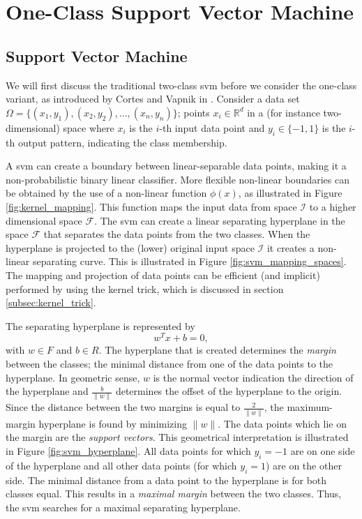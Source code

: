 \section{One-Class Support Vector Machine}\label{sec:one_class_svm}


\subsection{Support Vector Machine}\label{subsec:svm}
We will first discuss the traditional two-class \gls{svm} before we consider the one-class variant, as introduced by Cortes and Vapnik in \cite{cortes1995support}.
Consider a data set $\Omega = \{ (x_1, y_1),\allowbreak (x_2, y_2), \dots , (x_n, y_n) \}$; points $x_i \in \mathbb{R}^d$ in a (for instance two-dimensional) space where $x_i$ is the $i$-th input data point and $y_i \in \{-1, 1\}$ is the $i$-th output pattern, indicating the class membership.

A \gls{svm} can create a boundary between linear-separable data points, making it a non-probabilistic binary linear classifier.
More flexible non-linear boundaries can be obtained by the use of a non-linear function $\phi(x)$, as illustrated in Figure \ref{fig:kernel_mapping}.
This function maps the input data from space $\mathcal{I}$ to a higher dimensional space $\mathcal{F}$.
The \gls{svm} can create a linear separating hyperplane in the space $\mathcal{F}$ that separates the data points from the two classes.
When the hyperplane is projected to the (lower) original input space $\mathcal{I}$ it creates a non-linear separating curve.
This is illustrated in Figure \ref{fig:svm_mapping_spaces}.
The mapping and projection of data points can be efficient (and implicit) performed by using the kernel trick, which is discussed in section \ref{subsec:kernel_trick}.

The separating hyperplane is represented by
\begin{equation}
w^T x + b = 0,
\end{equation}
with $w \in F$ and $b \in R$.
The hyperplane that is created determines the \emph{margin} between the classes; the minimal distance from one of the data points to the hyperplane.
In geometric sense, $w$ is the normal vector indication the direction of the hyperplane and $\frac{b}{\lVert{w}\rVert}$ determines the offset of the hyperplane to the origin.
Since the distance between the two margins is equal to $\frac{2}{\lVert{w}\rVert}$, the maximum-margin hyperplane is found by minimizing $\lVert{w}\rVert$.
The data points which lie on the margin are the \emph{support vectors}.
This geometrical interpretation is illustrated in Figure \ref{fig:svm_hyperplane}.
All data points for which $y_i = -1$ are on one side of the hyperplane and all other data points (for which $y_i = 1$) are on the other side.
The minimal distance from a data point to the hyperplane is for both classes equal.
This results in a \emph{maximal margin} between the two classes.
Thus, the \gls{svm} searches for a maximal separating hyperplane.

